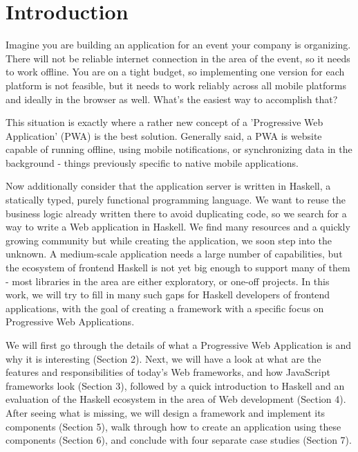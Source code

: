 \documentclass[english,odsaz]{fitthesis}
\date{\today}
\title{}
\begin{document}
\maketitle
\setlength{\parskip}{0pt}
{\hypersetup{hidelinks}\tableofcontents}
\iftotalfigures\listoffigures\fi
\iftotaltables\listoftables\fi
\iftotallistings\listoflistings\fi
\iftwoside\cleardoublepage\fi
\setlength{\parskip}{0.5\bigskipamount}

\chapter{Introduction}
\label{sec:org9f165e8}
Imagine you are building an application for an event your company is
organizing. There will not be reliable internet connection in the area of the
event, so it needs to work offline. You are on a tight budget, so implementing
one version for each platform is not feasible, but it needs to work reliably
across all mobile platforms and ideally in the browser as well. What's the
easiest way to accomplish that?

This situation is exactly where a rather new concept of a 'Progressive Web
Application' (PWA) is the best solution. Generally said, a PWA is website
capable of running offline, using mobile notifications, or synchronizing data in
the background - things previously specific to native mobile applications.

Now additionally consider that the application server is written in Haskell, a
statically typed, purely functional programming language. We want to reuse the
business logic already written there to avoid duplicating code, so we search for
a way to write a Web application in Haskell. We find many resources and a
quickly growing community but while creating the application, we soon step into
the unknown. A medium-scale application needs a large number of capabilities,
but the ecosystem of frontend Haskell is not yet big enough to support many of
them - most libraries in the area are either exploratory, or one-off projects.
In this work, we will try to fill in many such gaps for Haskell developers of
frontend applications, with the goal of creating a framework with a specific
focus on Progressive Web Applications.

We will first go through the details of what a Progressive Web Application is
and why it is interesting (Section 2). Next, we will have a look at what are the
features and responsibilities of today's Web frameworks, and how JavaScript
frameworks look (Section 3), followed by a quick introduction to Haskell and an
evaluation of the Haskell ecosystem in the area of Web development (Section
4). After seeing what is missing, we will design a framework and implement its
components (Section 5), walk through how to create an application using these
components (Section 6), and conclude with four separate case studies (Section
7).
\end{document}
